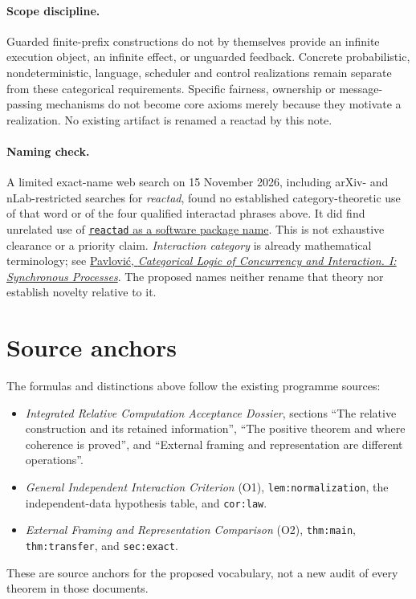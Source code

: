 \documentclass[11pt]{article}
\begin{document}
\paragraph{Scope discipline.}
Guarded finite-prefix constructions do not by themselves provide an
infinite execution object, an infinite effect, or unguarded feedback.
Concrete probabilistic, nondeterministic, language, scheduler and control
realizations remain separate from these categorical requirements.
Specific fairness, ownership or message-passing mechanisms do not become
core axioms merely because they motivate a realization. No existing
artifact is renamed a reactad by this note.

\paragraph{Naming check.}
A limited exact-name web search on 15 November 2026, including
arXiv- and nLab-restricted searches for \emph{reactad}, found no established
category-theoretic use of that word or of the four qualified interactad
phrases above. It did find unrelated use of
\href{https://www.skypack.dev/view/reactad}{\texttt{reactad} as a software
package name}. This is not exhaustive clearance or a priority claim.
\emph{Interaction category} is already mathematical terminology; see
\href{https://www.kestrel.edu/people/pavlovic/papers/CLCI.pdf}{Pavlovi\'c,
\emph{Categorical Logic of Concurrency and Interaction. I: Synchronous
Processes}}. The proposed names neither rename that theory nor establish
novelty relative to it.

\section*{Source anchors}
The formulas and distinctions above follow the existing programme sources:
\begin{itemize}
\item \emph{Integrated Relative Computation Acceptance Dossier}, sections
``The relative construction and its retained information'',
``The positive theorem and where coherence is proved'', and
``External framing and representation are different operations''.
\item \emph{General Independent Interaction Criterion} (O1),
\texttt{lem:normalization}, the independent-data hypothesis table,
and \texttt{cor:law}.
\item \emph{External Framing and Representation Comparison} (O2),
\texttt{thm:main}, \texttt{thm:transfer}, and \texttt{sec:exact}.
\end{itemize}
These are source anchors for the proposed vocabulary, not a new audit of
every theorem in those documents.
\end{document}

